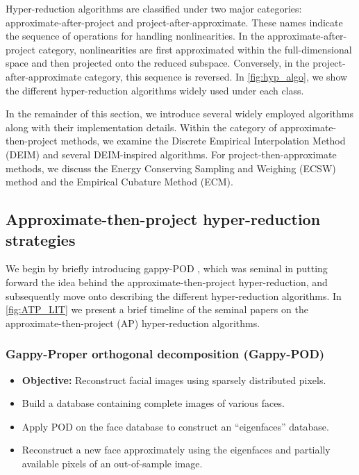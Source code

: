 \documentclass[11pt]{article}
\begin{document}
Hyper-reduction algorithms are classified under two major categories: approximate-after-project and project-after-approximate.
These names indicate the sequence of operations for handling nonlinearities.
In the approximate-after-project category, nonlinearities are first approximated within the full-dimensional space and then projected onto the reduced subspace.
Conversely, in the project-after-approximate category, this sequence is reversed.
In  \cref{fig:hyp_algo}, we show the different hyper-reduction algorithms widely used under each class.











In the remainder of this section, we introduce several widely employed algorithms along with their implementation details. 
Within the category of approximate-then-project methods, we examine the Discrete Empirical Interpolation Method (DEIM) and several DEIM-inspired algorithms. 
For project-then-approximate methods, we discuss the Energy Conserving Sampling and Weighing (ECSW) method and the Empirical Cubature Method (ECM).

\subsection{Approximate-then-project hyper-reduction strategies}

We begin by briefly introducing gappy-POD \cite{everson1995karhunen--loeve}, which was seminal in putting forward the idea behind the approximate-then-project hyper-reduction, and subsequently move onto describing the different hyper-reduction algorithms.
In \cref{fig:ATP_LIT} we present a brief timeline of the seminal papers on the approximate-then-project (AP) hyper-reduction algorithms.



\subsubsection{Gappy-Proper orthogonal decomposition (Gappy-POD)}
\label{sec:Gappy}

\noindent\hrulefill
\begin{itemize}
    \item {\bfseries Objective:} Reconstruct facial images using sparsely distributed pixels.
    \item Build a database containing complete images of various faces.
    \item Apply POD on the face database to construct an ``eigenfaces'' database.
    \item Reconstruct a new face approximately using the eigenfaces and partially available pixels of an out-of-sample image.
\end{itemize}
\noindent\hrulefill
\end{document}
